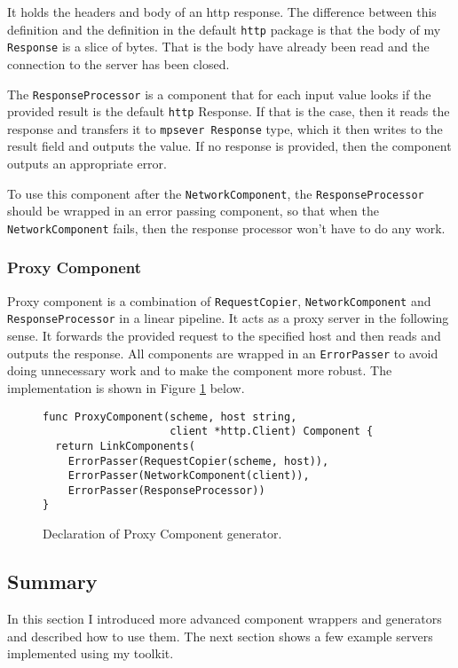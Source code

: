 It holds the headers and body of an http response. The difference between
this definition and the definition in the default \texttt{http} package is that
the body of my \texttt{Response} is a slice of bytes. 
That is the body have already been
read and the connection to the server has been closed.

The \texttt{ResponseProcessor} is a component that for each input value
looks if the provided result is the default \texttt{http} Response. 
If that is the case,
then it reads the response and transfers it to \texttt{mpsever Response} 
type, which it
then writes to the result field and outputs the value. If no response
is provided, then the component outputs an appropriate error.

To use this component after the \texttt{NetworkComponent}, 
the \texttt{ResponseProcessor}
should be wrapped in an error passing component, so that when the\\
\texttt{NetworkComponent} fails, then the response processor won't have to do
any work.

\subsubsection{Proxy Component}
Proxy component is a combination of \texttt{RequestCopier}, 
\texttt{NetworkComponent} 
and \texttt{ResponseProcessor} in a linear pipeline. It acts as a proxy server
in the following sense. It forwards the provided request to the specified
host and then reads and outputs the response. 
All components are wrapped
in an \texttt{ErrorPasser} to avoid doing unnecessary work and to make the component
more robust. The implementation is shown in Figure \ref{fig:ProxyComp} below.

\begin{figure}[h]
\centering
\begin{lstlisting}
func ProxyComponent(scheme, host string, 
                    client *http.Client) Component {
  return LinkComponents(
    ErrorPasser(RequestCopier(scheme, host)),
    ErrorPasser(NetworkComponent(client)),
    ErrorPasser(ResponseProcessor))
}
\end{lstlisting}
\caption[scale=1.0]{Declaration of Proxy Component generator.}
\label{fig:ProxyComp}
\end{figure}
\subsection{Summary}
In this section I introduced more advanced component wrappers and generators
and described how to use them. The next section shows a few example
servers implemented using my toolkit.

